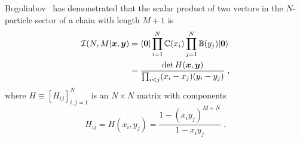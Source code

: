 \documentclass[a4paper,11pt]{amsart}
\begin{document}
Bogoliubov~\cite{Bogoliubov2005} has demonstrated that the scalar
product of two vectors in the \(N\)-particle sector of a chain with
length \(M+1\) is
\begin{equation}
\begin{split}
\label{eq:scalar}
  \mathcal{I}(N, M|\bm{x}, \bm{y}) & =
  \langle\bm{0}\rvert \prod_{i=1}^N \mathbb{C}(x_i) \prod_{j=1}^N \mathbb{B}(y_j) \lvert\bm{0}\rangle \\ 
 & = \frac{ \det H(\bm{x},\bm{y})}{ \prod_{i<j}(x_i - x_j)(y_i - y_j)} \; ,
\end{split}
\end{equation}
where \(H\equiv [H_{ij}]_{i,j=1}^N\) is an \(N\times N\) matrix with components
\begin{equation}
\label{eq:h-matrix}
  H_{ij} = H(x_i, y_j) 
  =\frac{1 - (x_i y_j)^{ M + N}}{1 - x_i y_j }\; .
\end{equation}

\end{document}
